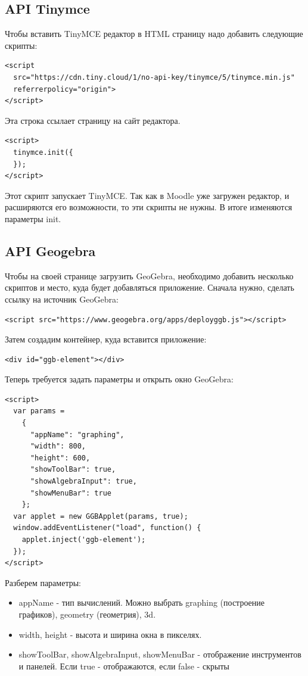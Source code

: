 \documentclass[14pt,Diplom]{diplomwork}
\begin{document}
\subsection{API Tinymce}
Чтобы вставить TinyMCE редактор в HTML страницу надо добавить следующие скрипты:
\begin{Verbatim}
<script 
  src="https://cdn.tiny.cloud/1/no-api-key/tinymce/5/tinymce.min.js" 
  referrerpolicy="origin">
</script>
\end{Verbatim}
Эта строка ссылает страницу на сайт редактора.
\begin{Verbatim}
<script>
  tinymce.init({
  });
</script>
\end{Verbatim}
Этот скрипт запускает TinyMCE. Так как в Moodle уже загружен редактор, и расширяются его возможности, то эти скрипты не нужны. В итоге изменяются параметры init.
\subsection{API Geogebra}
Чтобы на своей странице загрузить GeoGebra, необходимо добавить несколько скриптов и место, куда будет добавляться приложение. Сначала нужно, сделать ссылку на источник GeoGebra: 
\begin{Verbatim}
<script src="https://www.geogebra.org/apps/deployggb.js"></script>
\end{Verbatim}
Затем создадим контейнер, куда вставится приложение:
\begin{Verbatim}
<div id="ggb-element"></div>
\end{Verbatim}
Теперь требуется задать параметры и открыть окно GeoGebra:
\begin{Verbatim}
<script>  
  var params = 
    {
      "appName": "graphing",
      "width": 800,
      "height": 600,
      "showToolBar": true,
      "showAlgebraInput": true, 
      "showMenuBar": true 
    };
  var applet = new GGBApplet(params, true);
  window.addEventListener("load", function() { 
    applet.inject('ggb-element');
  });
</script>
\end{Verbatim}
Разберем параметры:

\begin{itemize}
	\item appName - тип вычислений. Можно выбрать graphing (построение графиков), geometry (геометрия), 3d.
	\item width, height - высота и ширина окна в пикселях.
	\item showToolBar, showAlgebraInput, showMenuBar - отображение инструментов и панелей. Если true - отображаются, если false - скрыты
\end{itemize}
\end{document}
